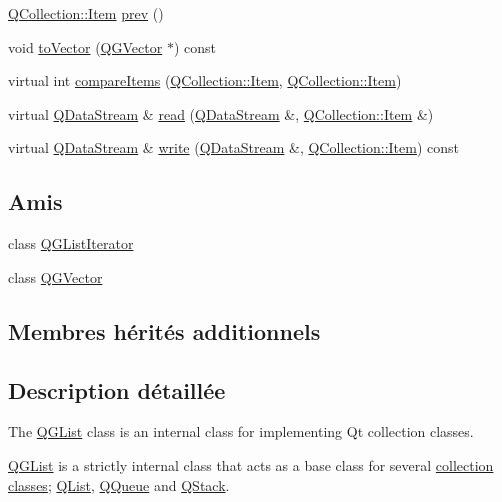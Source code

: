 \begin{DoxyCompactItemize}
\item 
\hyperlink{class_q_collection_ac6f3ddbf999e31fb797927f71ae6b5d7}{Q\+Collection\+::\+Item} \hyperlink{class_q_g_list_a6dc328630d029edac6f0af6ce896be20}{prev} ()
\item 
void \hyperlink{class_q_g_list_a40934c3ca7e1d2a7129517833c90036e}{to\+Vector} (\hyperlink{class_q_g_vector}{Q\+G\+Vector} $\ast$) const 
\item 
virtual int \hyperlink{class_q_g_list_a9a9c5fa3888371979c12e3207b3f9ec5}{compare\+Items} (\hyperlink{class_q_collection_ac6f3ddbf999e31fb797927f71ae6b5d7}{Q\+Collection\+::\+Item}, \hyperlink{class_q_collection_ac6f3ddbf999e31fb797927f71ae6b5d7}{Q\+Collection\+::\+Item})
\item 
virtual \hyperlink{class_q_data_stream}{Q\+Data\+Stream} \& \hyperlink{class_q_g_list_a96dd0ec54d1aca071fa29432dc0c2e8e}{read} (\hyperlink{class_q_data_stream}{Q\+Data\+Stream} \&, \hyperlink{class_q_collection_ac6f3ddbf999e31fb797927f71ae6b5d7}{Q\+Collection\+::\+Item} \&)
\item 
virtual \hyperlink{class_q_data_stream}{Q\+Data\+Stream} \& \hyperlink{class_q_g_list_a73e7c951a14a809263415b893b3f7099}{write} (\hyperlink{class_q_data_stream}{Q\+Data\+Stream} \&, \hyperlink{class_q_collection_ac6f3ddbf999e31fb797927f71ae6b5d7}{Q\+Collection\+::\+Item}) const 
\end{DoxyCompactItemize}
\subsection*{Amis}
\begin{DoxyCompactItemize}
\item 
class \hyperlink{class_q_g_list_a13dc100371e8931a394e57af8df9fbb3}{Q\+G\+List\+Iterator}
\item 
class \hyperlink{class_q_g_list_add83e2909bfdb7817ab2363440f946de}{Q\+G\+Vector}
\end{DoxyCompactItemize}
\subsection*{Membres hérités additionnels}


\subsection{Description détaillée}
The \hyperlink{class_q_g_list}{Q\+G\+List} class is an internal class for implementing Qt collection classes. 

\hyperlink{class_q_g_list}{Q\+G\+List} is a strictly internal class that acts as a base class for several \hyperlink{}{collection classes}; \hyperlink{class_q_list}{Q\+List}, \hyperlink{class_q_queue}{Q\+Queue} and \hyperlink{class_q_stack}{Q\+Stack}.

